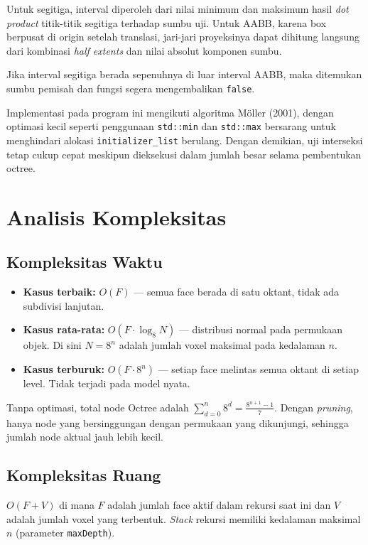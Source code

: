 \documentclass[12pt, a4paper]{report}
\begin{document}
Untuk segitiga, interval diperoleh dari nilai minimum dan maksimum hasil
\textit{dot product} titik-titik segitiga terhadap sumbu uji. Untuk
AABB, karena box berpusat di origin setelah translasi, jari-jari
proyeksinya dapat dihitung langsung dari kombinasi \textit{half extents}
dan nilai absolut komponen sumbu.

Jika interval segitiga berada sepenuhnya di luar interval AABB, maka
ditemukan sumbu pemisah dan fungsi segera mengembalikan
\texttt{false}.

Implementasi pada program ini mengikuti algoritma Möller (2001), dengan
optimasi kecil seperti penggunaan \texttt{std::min} dan \texttt{std::max}
bersarang untuk menghindari alokasi \texttt{initializer\_list} berulang.
Dengan demikian, uji interseksi tetap cukup cepat meskipun dieksekusi
dalam jumlah besar selama pembentukan octree.


\section{Analisis Kompleksitas}

\subsection{Kompleksitas Waktu}

\begin{itemize}
  \item \textbf{Kasus terbaik:} $O(F)$ — semua face berada di satu
        oktant, tidak ada subdivisi lanjutan.
  \item \textbf{Kasus rata-rata:} $O(F \cdot \log_8 N)$ — distribusi
        normal pada permukaan objek. Di sini $N = 8^n$ adalah jumlah
        voxel maksimal pada kedalaman $n$.
  \item \textbf{Kasus terburuk:} $O(F \cdot 8^n)$ — setiap face
        melintas semua oktant di setiap level. Tidak terjadi pada
        model nyata.
\end{itemize}

Tanpa optimasi, total node Octree adalah $\sum_{d=0}^{n} 8^d =
\frac{8^{n+1}-1}{7}$. Dengan \textit{pruning}, hanya node yang
bersinggungan dengan permukaan yang dikunjungi, sehingga jumlah
node aktual jauh lebih kecil.

\subsection{Kompleksitas Ruang}

$O(F + V)$ di mana $F$ adalah jumlah face aktif dalam rekursi saat ini
dan $V$ adalah jumlah voxel yang terbentuk. \textit{Stack} rekursi
memiliki kedalaman maksimal $n$ (parameter \texttt{maxDepth}).
\end{document}
